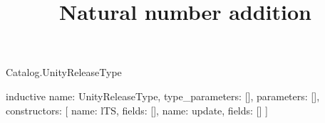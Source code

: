 \begin{lexlean}{Catalog.UnityReleaseType}
\title{Natural number addition}
\begin{semanticmodule}
inductive{
  name: UnityReleaseType,
  type_parameters: [],
  parameters: [],
  constructors: [
    {name: lTS, fields: []},
    {name: update, fields: []}
  ]
}
\end{semanticmodule}
\end{lexlean}
